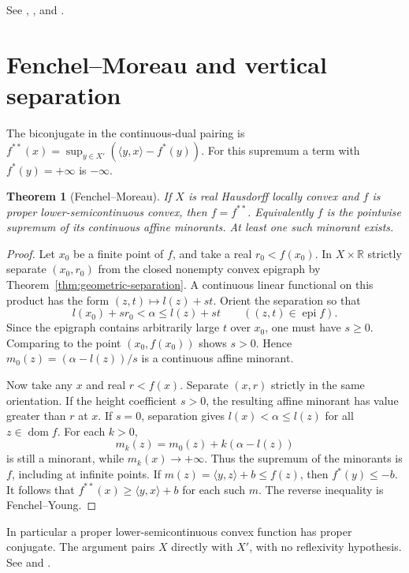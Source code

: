 \documentclass[11pt,oneside,openany]{book}
\theoremstyle{plain}
\newtheorem{theorem}{Theorem}[chapter]
\theoremstyle{definition}
\theoremstyle{remark}
\begin{document}
See \cite[\S\S12--16]{Rockafellar}, \cite[\S3.3]{Boyd},
and \cite[Chapter I, \S\S3--4]{EkelandTemam}.

\section{Fenchel--Moreau and vertical separation}\label{v02-05}

The biconjugate in the continuous-dual pairing is
\(f^{**}(x)=\sup_{y\in X'}(\langle y,x\rangle-f^*(y))\).
For this supremum a term with \(f^*(y)=+\infty\) is \(-\infty\).

\begin{theorem}[Fenchel--Moreau]\label{thm:fenchel-moreau}
If \(X\) is real Hausdorff locally convex and \(f\) is proper
lower-semicontinuous convex, then \(f=f^{**}\). Equivalently
\(f\) is the pointwise supremum of its continuous affine
minorants. At least one such minorant exists.
\end{theorem}

\begin{proof}
Let \(x_0\) be a finite point of \(f\), and take a real
\(r_0<f(x_0)\). In \(X\times\mathbb R\) strictly separate
\((x_0,r_0)\) from the closed nonempty convex epigraph by
Theorem~\ref{thm:geometric-separation}. A continuous linear
functional on this product has the form
\((z,t)\mapsto l(z)+s t\). Orient the separation so that
\[
 l(x_0)+s r_0<\alpha\le l(z)+s t
       \qquad ((z,t)\in\operatorname{epi} f).
\]
Since the epigraph contains arbitrarily large \(t\) over
\(x_0\), one must have \(s\ge0\). Comparing to the point
\((x_0,f(x_0))\) shows \(s>0\). Hence
\(m_0(z)=(\alpha-l(z))/s\) is a continuous affine minorant.

Now take any \(x\) and real \(r<f(x)\). Separate \((x,r)\)
strictly in the same orientation. If the height coefficient
\(s>0\), the resulting affine minorant has value greater
than \(r\) at \(x\). If \(s=0\), separation gives
\(l(x)<\alpha\le l(z)\) for all \(z\in\operatorname{dom}f\).
For each \(k>0\),
\[
 m_k(z)=m_0(z)+k(\alpha-l(z))
\]
is still a minorant, while \(m_k(x)\to+\infty\).
Thus the supremum of the minorants is \(f\), including at
infinite points. If \(m(z)=\langle y,z\rangle+b\le f(z)\),
then \(f^*(y)\le-b\). It follows that
\(f^{**}(x)\ge\langle y,x\rangle+b\) for each such \(m\).
The reverse inequality is Fenchel--Young.
\end{proof}

In particular a proper lower-semicontinuous convex function
has proper conjugate. The argument pairs \(X\) directly
with \(X'\), with no reflexivity hypothesis. See
\cite[Chapter I, \S\S3--4]{EkelandTemam} and
\cite[Theorems 12.1--12.2]{Rockafellar}.
\end{document}
